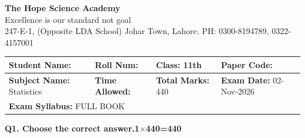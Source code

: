 \documentclass[11pt,a4paper]{article}
\begin{document}
\begin{center}
  {\Huge\bfseries The Hope Science Academy}\\[3pt]
  {\small Excellence is our standard not goal}\\[2pt]
  {\small 247-E-1, (Opposite LDA School) Johar Town, Lahore. PH: 0300-8194789, 0322-4157001}
\end{center}

\medskip
\noindent
\begin{tabularx}{\linewidth}{|X|X|X|X|}
\hline
\textbf{Student Name:} & \textbf{Roll Num:} & \textbf{Class:} 11th & \textbf{Paper Code:} \\ \hline
\textbf{Subject Name:} Statistics & \textbf{Time Allowed:} & \textbf{Total Marks:} 440 & \textbf{Exam Date:} 02-Nov-2026 \\ \hline
\multicolumn{4}{|l|}{\textbf{Exam Syllabus:} FULL BOOK} \\ \hline
\end{tabularx}

\bigskip
\noindent\textbf{Q1. Choose the correct answer.}\hfill\textbf{1$\times$440=440}
\end{document}
